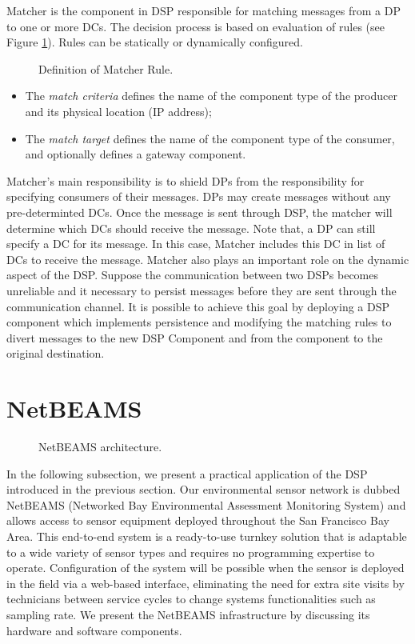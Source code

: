 \documentclass[conference]{IEEEtran}
\begin{document}
Matcher is the component in DSP responsible for matching messages from a DP to one or more
DCs. The decision process is based on evaluation of rules (see Figure
\ref{FIG_MATCHER_RULE}). Rules can be statically or dynamically
configured. 

\begin{figure}[!htb]
 \caption{\label{FIG_MATCHER_RULE} Definition of Matcher Rule.}
\end{figure}

\begin{itemize}
\item The \emph{match criteria} defines the name of the component type
  of the producer and its physical location (IP address);
\item The \emph{match target} defines the name of the component type
  of the consumer, and optionally defines a gateway component.
\end{itemize}

Matcher's main responsibility is to shield DPs from the responsibility
for specifying consumers of their messages. DPs may create messages without any pre-determinted
DCs. Once the message is sent through DSP, the matcher will determine which DCs should
receive the message. Note that, a DP can still specify a DC for its message. In this case, Matcher
includes this DC in list of DCs to receive the message. Matcher also plays an important role on
the dynamic aspect of the DSP. Suppose the communication between two DSPs becomes unreliable and
it necessary to persist messages before they are sent through the communication channel. It is possible to
achieve this goal by deploying a DSP component which implements persistence and modifying the matching
rules to divert messages to the new DSP Component and from the component to the original destination.



\section{NetBEAMS}
\label{SEC_NETBEAMS}

\begin{figure*} 
\centering
{}
\caption{\label{FIG_NETBEAMS} NetBEAMS architecture.}
\end{figure*}

In the following subsection, we present a practical application of the DSP
introduced in the previous section. Our environmental sensor network
is dubbed NetBEAMS (Networked Bay Environmental Assessment Monitoring
System) and allows access to sensor equipment deployed throughout the
San Francisco Bay Area. This end-to-end system is a ready-to-use
turnkey solution that is adaptable to a wide variety of sensor types
and requires no programming expertise to operate. Configuration of the
system will be possible when the sensor is deployed in the field via a
web-based interface, eliminating the need for extra site visits by
technicians between service cycles to change systems functionalities
such as sampling rate.  We present the NetBEAMS infrastructure by
discussing its hardware and software components.
\end{document}
